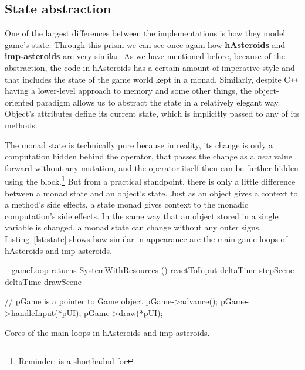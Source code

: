 \documentclass[
  digital, %
  color,   %
  table,   %
  oneside, %
  lof,     %
  lot,     %
]{fithesis3}
\newcommand{\cpp}{C\nolinebreak\texttt{+}\nolinebreak\texttt{+}}
\begin{document}
{\subsection{State abstraction}
\label{sect:stateabstraction}
One of the largest differences between the implementations is how they model game's state.
Through this prism we can see once again how \textbf{hAsteroids} and \textbf{imp-asteroids}
are very similar. As we have mentioned before, because of the abstraction,
the code in hAsteroids has a certain amount of imperative style and that includes the state
of the game world kept in a monad. Similarly, despite \cpp{} having a lower-level
approach to memory and some other things, the object-oriented paradigm allows us
to abstract the state in a relatively elegant way. Object's attributes
define its current state, which is implicitly passed to any of its methods.

The monad state is technically pure because in reality,
its change is only a computation hidden behind the \inlinehs{>>=} operator,
that passes the change as a \emph{new} value forward without any mutation,
and the operator itself then can be further hidden using the  block.\footnote{
Reminder:  is a shorthadnd for
}
But from a practical standpoint, there is only a little difference between a monad state
and an object's state. Just as an object gives a context to a method's side effects,
a state monad gives context to the monadic computation's side effects.
In the same way that an object stored in a single variable is changed, a monad state
can change without any outer signs. Listing~\ref{lst:state} shows how similar in appearance
are the main game loops of hAsteroids and imp-asteroids.

\begin{listing}
\begin{haskell}
-- gameLoop returns SystemWithResources ()
reactToInput deltaTime
stepScene deltaTime
drawScene
\end{haskell}
\begin{cppblock}
// pGame is a pointer to Game object
pGame->advance();
pGame->handleInput(*pUI);
pGame->draw(*pUI);
\end{cppblock}
\caption{Cores of the main loops in hAsteroids and imp-asteroids.}
\label{lst:state}
\end{listing}

}
\end{document}
